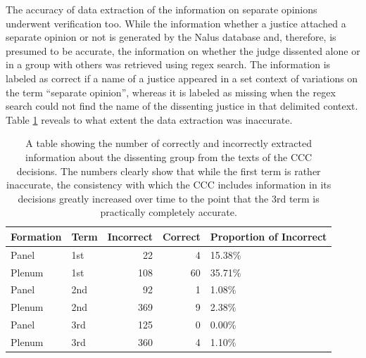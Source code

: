 \documentclass[
  11pt,
]{article}
\begin{document}
The accuracy of data extraction of the information on separate opinions underwent verification too. While the information whether a justice attached a separate opinion or not is generated by the Nalus database and, therefore, is presumed to be accurate, the information on whether the judge dissented alone or in a group with others was retrieved using regex search. The information is labeled as correct if a name of a justice appeared in a set context of variations on the term ``separate opinion'', whereas it is labeled as missing when the regex search could not find the name of the dissenting justice in that delimited context. Table \ref{tab:check-separate-opinions-tab} reveals to what extent the data extraction was inaccurate.

\begin{table}
\centering
\caption{\label{tab:check-separate-opinions-tab}A table showing the number of correctly and incorrectly extracted information about the dissenting group from the texts of the CCC decisions. The numbers clearly show that while the first term is rather inaccurate, the consistency with which the CCC includes information in its decisions greatly increased over time to the point that the 3rd term is practically completely accurate.}
\centering
\begin{tabular}[t]{l|l|r|r|l}
\hline
Formation & Term & Incorrect & Correct & Proportion of Incorrect\\
\hline
Panel & 1st & 22 & 4 & 15.38\%\\
\hline
Plenum & 1st & 108 & 60 & 35.71\%\\
\hline
Panel & 2nd & 92 & 1 & 1.08\%\\
\hline
Plenum & 2nd & 369 & 9 & 2.38\%\\
\hline
Panel & 3rd & 125 & 0 & 0.00\%\\
\hline
Plenum & 3rd & 360 & 4 & 1.10\%\\
\hline
\end{tabular}
\end{table}
\end{document}
